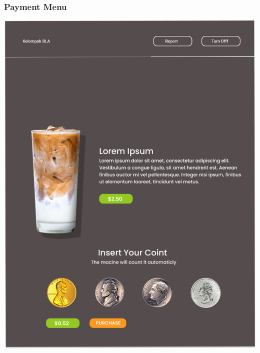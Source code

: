 \documentclass[12pt]{article}
\begin{document}
\subsubsection{Payment Menu}
\includegraphics[width=1\linewidth]{./img/Payment.png}
\end{document}
